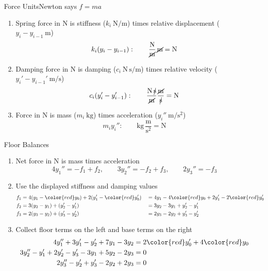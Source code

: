 \begin{frame}{Force Units\qquad Newton says $f=ma$}
\begin{enumerate}
  \item Spring force in $\mathrm{N}$ is stiffness ($k_i\ \mathrm{N/m}$) times relative displacement ($y_i-y_{i-1}\ \mathrm{m}$)
  \[
    k_i(y_i-y_{i-1}):\qquad
    \frac{\mathrm{N}}{\cancel{\mathrm{m}}}\,\cancel{\mathrm{m}}=\mathrm{N}
  \]
  \item Damping force in $\mathrm{N}$ is damping ($c_i\ \mathrm{N\,s/m}$) times relative velocity ($y_i'-y_{i-1}'\ \mathrm{m/s}$)
  \[
    c_i(y_i'-y_{i-1}'):\qquad
    \frac{\mathrm{N}\,\cancel{\mathrm{s}}}{\cancel{\mathrm{m}}}
    \frac{\cancel{\mathrm{m}}}{\cancel{\mathrm{s}}}=\mathrm{N}
  \]
  \item Force in $\mathrm{N}$ is mass ($m_i\ \mathrm{kg}$) times acceleration ($y_i''\ \mathrm{m/s^2}$)
  \[
    m_i y_i'':\qquad
    \mathrm{kg}\,\frac{\mathrm{m}}{\mathrm{s}^2}=\mathrm{N}
  \]
\end{enumerate}
\end{frame}
\begin{frame}{Floor Balances}
\begin{enumerate}
  \item Net force in $\mathrm{N}$ is mass times acceleration
  \[
    4y_1''=-f_1+f_2,\qquad
    3y_2''=-f_2+f_3,\qquad
    2y_3''=-f_3
  \]
  \item Use the displayed stiffness and damping values
  \[
    \begin{aligned}
      f_1&=4(y_1-{\color{red}y_0})+2(y_1'-{\color{red}y_0'}) &&=4y_1-4{\color{red}y_0}+2y_1'-2{\color{red}y_0'}\\
      f_2&=3(y_2-y_1)+(y_2'-y_1') &&=3y_2-3y_1+y_2'-y_1'\\
      f_3&=2(y_3-y_2)+(y_3'-y_2') &&=2y_3-2y_2+y_3'-y_2'
    \end{aligned}
  \]
  \item Collect floor terms on the left and base terms on the right
  \[
    \begin{aligned}
      4y_1''+3y_1'-y_2'+7y_1-3y_2&=2{\color{red}y_0'}+4{\color{red}y_0}\\
      3y_2''-y_1'+2y_2'-y_3'-3y_1+5y_2-2y_3&=0\\
      2y_3''-y_2'+y_3'-2y_2+2y_3&=0
    \end{aligned}
  \]
\end{enumerate}
\end{frame}

